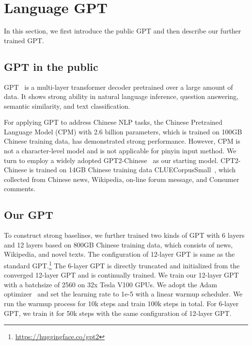 \section{Language GPT}
\label{sec:frozen}

In this section, we first introduce the public GPT and then describe our further trained GPT.

\subsection{GPT in the public}
GPT~\cite{radford2018improving,radford2019language} is a multi-layer transformer decoder pretrained over a large amount of data.
It shows strong ability in natural language inference, question answering, semantic similarity, and text classification. 

For applying GPT to address Chinese NLP tasks, the Chinese Pretrained Language Model (CPM) with 2.6 billion parameters, which is \citep{cpm-v1} trained on 100GB Chinese training data, has demonstrated strong performance. However, CPM is not a character-level model and is not applicable for pinyin input method. We turn to employ a widely adopted GPT2-Chinese~\cite{GPT2-Chinese} as our starting model. CPT2-Chinese is trained on 14GB Chinese training data CLUECorpusSmall~\cite{CLUECorpus2020}, which collected from Chinese news, Wikipedia, on-line forum message, and Consumer comments.



\subsection{Our GPT} 
To construct strong baselines, we further trained two kinds of GPT with 6 layers and 12 layers based on 800GB Chinese training data, which consists of news, Wikipedia, and novel texts. The configuration of 12-layer GPT is same as the standard GPT.\footnote{\url{https://huggingface.co/gpt2}} The 6-layer GPT is directly truncated and initialized from the converged 12-layer GPT and is continually trained. We train our 12-layer GPT with a batchsize of 2560 on 32x Tesla V100 GPUs. We adopt the Adam optimizer~\cite{kingma2014adam} and set the learning rate to 1e-5 with a linear warmup scheduler. We run the warmup process for 10k steps and train 100k steps in total. For 6-layer GPT, we train it for 50k steps with the same configuration of 12-layer GPT.

